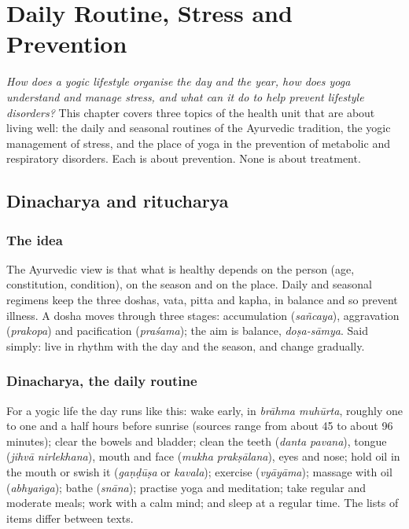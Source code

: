 \chapter{Daily Routine, Stress and Prevention}
\label{ch:lifestyle-stress}

\emph{How does a yogic lifestyle organise the day and the year, how does yoga understand and manage stress, and what can it do to help prevent lifestyle disorders?}
This chapter covers three topics of the health unit that are about living well: the daily and seasonal routines of the Ayurvedic tradition, the yogic management of stress, and the place of yoga in the prevention of metabolic and respiratory disorders. Each is about prevention. None is about treatment.

\section{Dinacharya and ritucharya}

\subsection*{The idea}
The Ayurvedic view is that what is healthy depends on the person (age, constitution, condition), on the season and on the place. Daily and seasonal regimens keep the three doshas, vata, pitta and kapha, in balance and so prevent illness. A dosha moves through three stages: accumulation (\emph{sañcaya}), aggravation (\emph{prakopa}) and pacification (\emph{praśama}); the aim is balance, \emph{doṣa-sāmya}. Said simply: live in rhythm with the day and the season, and change gradually.

\subsection*{Dinacharya, the daily routine}
For a yogic life the day runs like this: wake early, in \emph{brāhma muhūrta}, roughly one to one and a half hours before sunrise (sources range from about 45 to about 96 minutes); clear the bowels and bladder; clean the teeth (\emph{danta pavana}), tongue (\emph{jihvā nirlekhana}), mouth and face (\emph{mukha prakṣālana}), eyes and nose; hold oil in the mouth or swish it (\emph{gaṇḍūṣa} or \emph{kavala}); exercise (\emph{vyāyāma}); massage with oil (\emph{abhyaṅga}); bathe (\emph{snāna}); practise yoga and meditation; take regular and moderate meals; work with a calm mind; and sleep at a regular time. The lists of items differ between texts.

